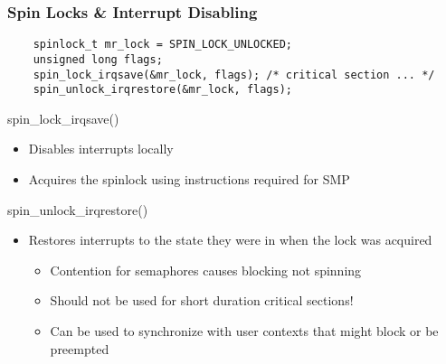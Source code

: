 \begin{frame}[fragile]
    \frametitle{Spin Locks \& Interrupt Disabling}
    \large    
    \begin{block}{}
        \begin{verbatim}
    spinlock_t mr_lock = SPIN_LOCK_UNLOCKED;
    unsigned long flags;
    spin_lock_irqsave(&mr_lock, flags); /* critical section ... */
    spin_unlock_irqrestore(&mr_lock, flags);
\end{verbatim}
    \end{block}        
    
    \Large
    spin\_lock\_irqsave()
    \begin{itemize}
        \item Disables interrupts locally
        \item Acquires the spinlock using instructions required for SMP
    \end{itemize}    
    spin\_unlock\_irqrestore()
    \begin{itemize}
        \item Restores interrupts to the state they were in when the
        lock was acquired\large
        \begin{itemize}
            \item Contention for semaphores causes blocking not spinning
            \item Should not be used for short duration critical sections!
            \item Can be used to synchronize with user contexts that
            might block or be preempted
        \end{itemize}  
    \end{itemize} 
    
\end{frame}



